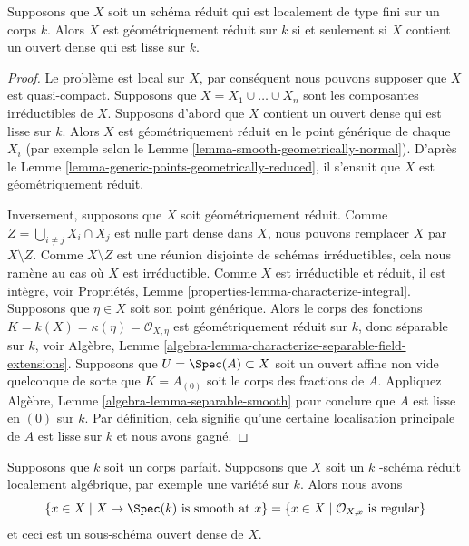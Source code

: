 \begin{lemma}
\label{lemma-geometrically-reduced-dense-smooth-open}
Supposons que $X$ soit un schéma réduit qui est localement de type
fini sur un corps $k$. Alors $X$ est géométriquement réduit sur $k$
si et seulement si $X$ contient un ouvert dense qui est lisse sur $k$.
\end{lemma}

\begin{proof}
Le problème est local sur $X$, par conséquent nous pouvons supposer que
$X$ est quasi-compact. Supposons que $X = X_1 \cup \ldots \cup X_n$ sont
les composantes irréductibles de $X$. Supposons d'abord que $X$ contient
un ouvert dense qui est lisse sur $k$. Alors $X$ est géométriquement
réduit en le point générique de chaque $X_i$ (par exemple selon le Lemme
\ref{lemma-smooth-geometrically-normal}). D'après le Lemme
\ref{lemma-generic-points-geometrically-reduced}, il s'ensuit que $X$ est géométriquement réduit.

\medskip\noindent
Inversement, supposons que $X$ soit géométriquement réduit.
Comme $Z = \bigcup_{i \not = j} X_i \cap X_j$ est nulle part
dense dans $X$, nous pouvons remplacer $X$ par $X \setminus Z$.
Comme $X \setminus Z$ est une réunion disjointe de schémas
irréductibles, cela nous ramène au cas où $X$ est irréductible.
Comme $X$ est irréductible et réduit, il est intègre, voir
Propriétés, Lemme \ref{properties-lemma-characterize-integral}.
Supposons que $\eta \in X$ soit son point générique. Alors le
corps des fonctions $K = k(X) = \kappa(\eta) = \mathcal{O}_{X,
\eta}$ est géométriquement réduit sur $k$, donc séparable sur
$k$, voir Algèbre, Lemme
\ref{algebra-lemma-characterize-separable-field-extensions}. Supposons
que $U = \Spec(A) \subset X$ soit un ouvert affine non vide quelconque
de sorte que $K = A_{(0)}$ soit le corps des fractions de $A$. Appliquez
Algèbre, Lemme \ref{algebra-lemma-separable-smooth} pour conclure que
$A$ est lisse en $(0)$ sur $k$. Par définition, cela signifie qu'une
certaine localisation principale de $A$ est lisse sur $k$ et nous avons gagné.
\end{proof}

\begin{lemma}
\label{lemma-dense-smooth-open-variety-over-perfect-field}
Supposons que $k$ soit un corps parfait. Supposons que $X$ soit un $k$ -schéma
réduit localement algébrique, par exemple une variété sur $k$. Alors nous avons
$$
\{x \in X \mid X \to \Spec(k)\text{ is smooth at }x\} =
\{x \in X \mid \mathcal{O}_{X, x}\text{ is regular}\}
$$
et ceci est un sous-schéma ouvert dense de $X$.
\end{lemma}

